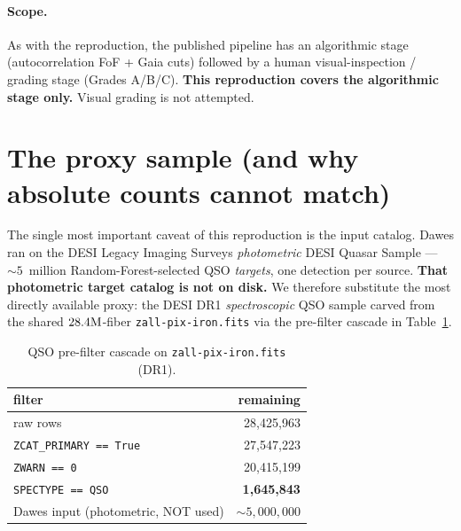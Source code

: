 \documentclass[11pt,letterpaper]{article}
\begin{document}
\paragraph{Scope.} As with the \citet{hsu2025pairwise} reproduction, the
published pipeline has an algorithmic stage (autocorrelation FoF + Gaia
cuts) followed by a human visual-inspection / grading stage (Grades
A/B/C). \textbf{This reproduction covers the algorithmic stage only.}
Visual grading is not attempted.

\section{The proxy sample (and why absolute counts cannot match)}

The single most important caveat of this reproduction is the input
catalog. Dawes ran on the DESI Legacy Imaging Surveys \emph{photometric}
DESI Quasar Sample --- ${\sim}5$~million Random-Forest-selected QSO
\emph{targets}, one detection per source. \textbf{That photometric target
catalog is not on disk.} We therefore substitute the most directly
available proxy: the DESI DR1 \emph{spectroscopic} QSO sample carved from
the shared $28.4{\rm M}$-fiber \texttt{zall-pix-iron.fits}
\autocite{desidr1} via the pre-filter cascade in Table~\ref{tab:prefilter}.

\begin{table}[ht]
\centering
\caption{QSO pre-filter cascade on \texttt{zall-pix-iron.fits} (DR1).}
\label{tab:prefilter}
\begin{tabular}{lr}
\toprule
filter                                     & remaining \\
\midrule
raw rows                                   & 28{,}425{,}963 \\
\texttt{ZCAT\_PRIMARY == True}             & 27{,}547{,}223 \\
\texttt{ZWARN == 0}                        & 20{,}415{,}199 \\
\texttt{SPECTYPE == QSO}                   & \textbf{1{,}645{,}843} \\
\midrule
Dawes input (photometric, NOT used)        & ${\sim}5{,}000{,}000$ \\
\bottomrule
\end{tabular}
\end{table}
\end{document}
